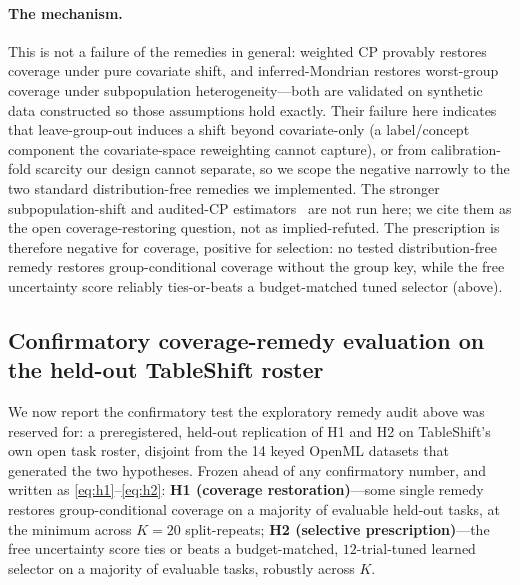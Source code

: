 \documentclass[pdflatex,sn-mathphys-num]{sn-jnl}
\begin{document}
\paragraph{The mechanism.} This is not a failure of the remedies in general: weighted CP provably restores
coverage under pure covariate shift, and inferred-Mondrian restores worst-group coverage under subpopulation
heterogeneity---both are validated on synthetic data constructed so those assumptions hold exactly.
Their failure here indicates that leave-group-out
induces a shift beyond covariate-only (a label/concept component the covariate-space reweighting cannot
capture), or from calibration-fold scarcity our design cannot separate, so we scope the negative narrowly
to the two standard distribution-free remedies we implemented. The stronger subpopulation-shift and audited-CP
estimators~\citep{subpop2025conformal,audited2026conformal} are not run here; we cite them as the open
coverage-restoring question, not as implied-refuted. The prescription is therefore negative for
coverage, positive for selection: no tested distribution-free remedy restores group-conditional coverage
without the group key, while the free uncertainty score reliably ties-or-beats a budget-matched tuned selector
(above).

\subsection*{Confirmatory coverage-remedy evaluation on the held-out TableShift roster}
We now report the confirmatory test the exploratory remedy audit above was reserved for: a preregistered,
held-out replication of H1 and H2 on TableShift's own open task roster, disjoint from the 14 keyed OpenML
datasets that generated the two hypotheses. Frozen ahead of any confirmatory number, and written as \eqref{eq:h1}--\eqref{eq:h2}: \textbf{H1 (coverage
restoration)}---some single remedy restores group-conditional coverage on a majority of evaluable held-out
tasks, at the minimum across $K{=}20$ split-repeats; \textbf{H2 (selective prescription)}---the free
uncertainty score ties or beats a budget-matched, $12$-trial-tuned learned selector on a majority of
evaluable tasks, robustly across $K$.
\end{document}
